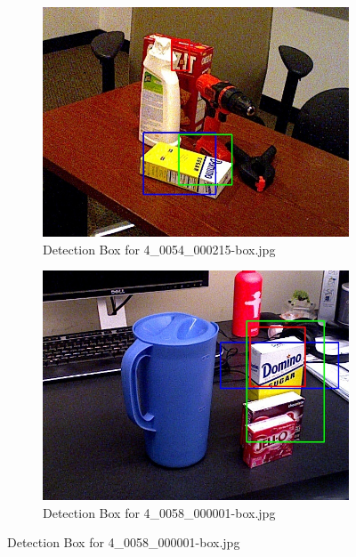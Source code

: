 \documentclass[10.5pt,a4paper]{article}
\begin{document}
    \clearpage
    \begin{figure} [h]
    \begin{subfigure}{0.45\textwidth}
        \centering
        \includegraphics[width=\textwidth]{img/4_0054_000215-box.jpg}
        \caption{Detection Box for 4\_0054\_000215-box.jpg}
        \label{fig:img7}
    \end{subfigure}
    \hfill
    \begin{subfigure}{0.45\textwidth}
        \centering
        \includegraphics[width=\textwidth]{img/4_0058_000001-box.jpg}
        \caption{Detection Box for 4\_0058\_000001-box.jpg}
        \label{fig:img8}
    \end{subfigure}


\end{figure}
\end{document}
